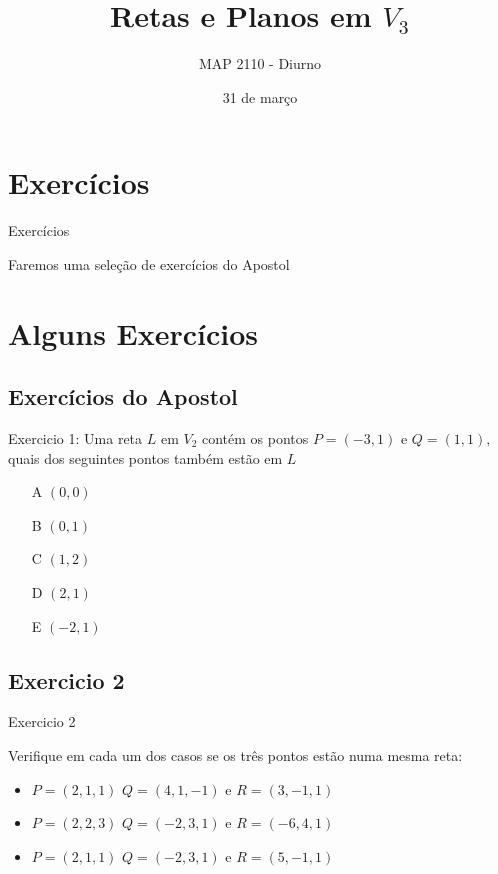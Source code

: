 \documentclass{beamer}
\title[Retas e Planos]{Retas e Planos em $V_3$}
\author{MAP 2110 - Diurno}
\institute{IME USP}
\date{31 de março}
\begin{document}
\begin{frame}
  \titlepage
\end{frame}


\section {Exercícios}

\begin{frame}{Exercícios}
 
 Faremos uma seleção de exercícios do Apostol

\end{frame}

\section{Alguns Exercícios}

\subsection{Exercícios do Apostol}

\begin{frame}{Exercicio 1:}
Uma reta $L$ em $V_2$ contém os pontos $P=(-3,1)$ e $Q=(1,1),$ quais dos seguintes pontos também estão em $L$
\begin{itemize}
   \item[A]$(0,0)$
   \item[B]$(0,1)$
   \item[C]$(1,2)$
   \item[D]$(2,1)$
   \item[E]$(-2,1)$
\end{itemize}
\end{frame}

\subsection{Exercicio 2}

\begin{frame}{Exercicio 2}

Verifique em cada um dos casos se os três pontos estão numa mesma reta:
\begin{itemize}
    \item $P=(2,1,1)$ $Q=(4,1,-1)$ e $R=(3,-1,1)$
    \item $P=(2,2,3)$ $Q=(-2,3,1)$ e $R=(-6,4,1)$
    \item $P=(2,1,1)$ $Q=(-2,3,1)$ e $R=(5,-1,1)$
\end{itemize}

\end{frame}
\end{document}
